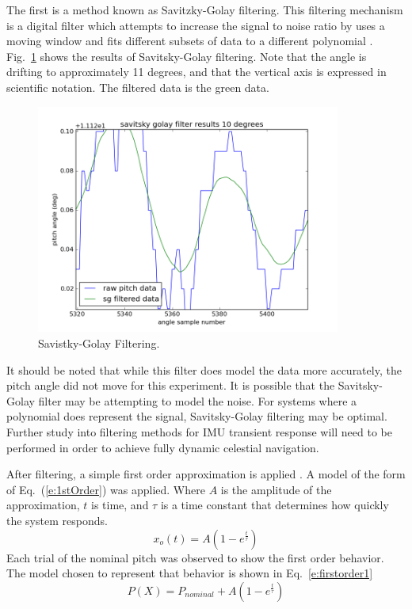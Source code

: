 \documentclass[12pt,a4paper]{book}
\begin{document}
The first is a method known as Savitzky-Golay filtering.  This filtering mechanism is a digital filter which attempts to increase the signal to noise ratio by uses a moving window and fits different subsets of data to a different polynomial \cite{b:savgol}. Fig.~\ref{f:savgol} shows the results of Savitsky-Golay filtering.  Note that the angle is drifting to approximately 11 degrees, and that the vertical axis is expressed in scientific notation. The filtered data is the green data.
\begin{figure}[!ht]%
\centering
 \includegraphics[width=10cm]{savgolay.png}
 \caption{Savistky-Golay Filtering.  }
 \label{f:savgol}
\end{figure} 
\FloatBarrier
It should be noted that while this filter does model the data more accurately, the pitch angle did not move for this experiment.  It is possible that the Savitsky-Golay filter may be attempting to model the noise.  For systems where a polynomial does represent the signal, Savitsky-Golay filtering may be optimal.  Further study into filtering methods for IMU transient response will need to be performed in order to achieve fully dynamic celestial navigation.

After filtering, a simple first order approximation is applied  \cite{b:ogata}.  A model of the form of Eq.~(\ref{e:1stOrder}) was applied. Where $A$ is the amplitude of the approximation, $t$ is time, and $\tau$ is a time constant that determines how quickly the system responds.  
\begin{equation}
x_{o}(t) = A(1-e^{\frac{t}{\tau}})
\label{e:1stOrder}
\end{equation}
Each trial of the nominal pitch was observed to show the first order behavior.  The model chosen to represent that behavior is shown in Eq.~\ref{e:firstorder1}
\begin{equation}
P(X) = P_{nominal} + A(1-e^{\frac{t}{\tau}})
\label{e:firstorder1}
\end{equation}
\end{document}
